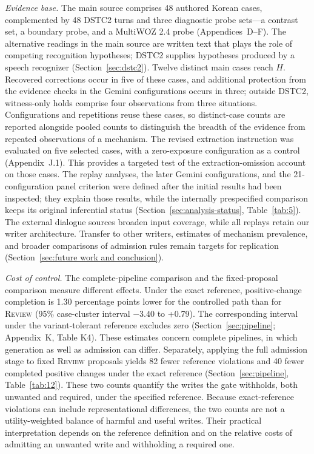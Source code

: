 \documentclass[acmsmall,review]{acmart}
\newcommand{\review}{\textsc{Review}}
\begin{document}
\emph{Evidence base.} The main source comprises 48 authored Korean cases, complemented by 48 DSTC2 turns and three diagnostic probe sets---a contrast set, a boundary probe, and a MultiWOZ 2.4 probe (Appendices~D--F). The alternative readings in the main source are written text that plays the role of competing recognition hypotheses; DSTC2 supplies hypotheses produced by a speech recognizer (Section~\ref{sec:dstc2}). Twelve distinct main cases reach $H$. Recovered corrections occur in five of these cases, and additional protection from the evidence checks in the Gemini configurations occurs in three; outside DSTC2, witness-only holds comprise four observations from three situations. Configurations and repetitions reuse these cases, so distinct-case counts are reported alongside pooled counts to distinguish the breadth of the evidence from repeated observations of a mechanism. The revised extraction instruction was evaluated on five selected cases, with a zero-exposure configuration as a control (Appendix~J.1). This provides a targeted test of the extraction-omission account on those cases. The replay analyses, the later Gemini configurations, and the 21-configuration panel criterion were defined after the initial results had been inspected; they explain those results, while the internally prespecified comparison keeps its original inferential status (Section~\ref{sec:analysis-status}, Table~\ref{tab:5}). The external dialogue sources broaden input coverage, while all replays retain our writer architecture. Transfer to other writers, estimates of mechanism prevalence, and broader comparisons of admission rules remain targets for replication (Section~\ref{sec:future work and conclusion}).

\emph{Cost of control.} The complete-pipeline comparison and the fixed-proposal comparison measure different effects. Under the exact reference, positive-change completion is 1.30 percentage points lower for the controlled path than for \review{} (95\% case-cluster interval $-$3.40 to +0.79). The corresponding interval under the variant-tolerant reference excludes zero (Section~\ref{sec:pipeline}; Appendix~K, Table K4). These estimates concern complete pipelines, in which generation as well as admission can differ. Separately, applying the full admission stage to fixed \review{} proposals yields 82 fewer reference violations and 40 fewer completed positive changes under the exact reference (Section~\ref{sec:pipeline}, Table~\ref{tab:12}). These two counts quantify the writes the gate withholds, both unwanted and required, under the specified reference. Because exact-reference violations can include representational differences, the two counts are not a utility-weighted balance of harmful and useful writes. Their practical interpretation depends on the reference definition and on the relative costs of admitting an unwanted write and withholding a required one.
\end{document}
